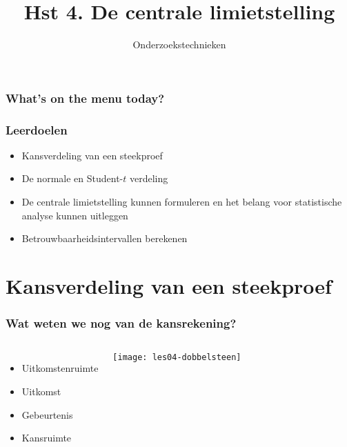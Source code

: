 \documentclass[aspectratio=169]{beamer}
\title{Hst 4. De centrale limietstelling}
\subtitle{Onderzoekstechnieken}
\begin{document}
\begin{frame}
  \maketitle
\end{frame}

\begin{frame}
  \frametitle{What's on the menu today?}
  
  \tableofcontents
\end{frame}

\begin{frame}
  \frametitle{Leerdoelen}
  
  \begin{itemize}
    \item Kansverdeling van een steekproef
    \item De normale en Student-$t$ verdeling
    \item De centrale limietstelling kunnen formuleren en het belang voor statistische analyse kunnen uitleggen
    \item Betrouwbaarheidsintervallen berekenen
  \end{itemize}
\end{frame}

\section{Kansverdeling van een steekproef}

\begin{frame}
  \frametitle{Wat weten we nog van de kansrekening?}
  
  \begin{columns}
    \begin{itemize}
      \item Uitkomstenruimte
      \item Uitkomst
      \item Gebeurtenis
      \item Kansruimte
    \end{itemize}
    
    \centering
    \texttt{[image: les04-dobbelsteen]}
  \end{columns}
  
\end{frame}
\end{document}
